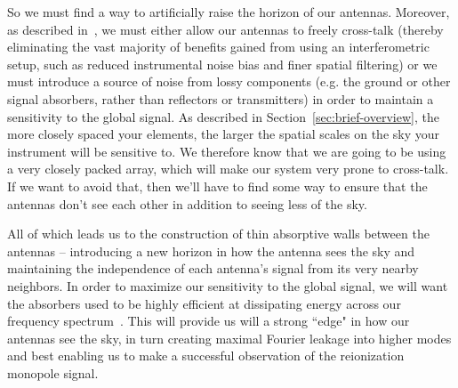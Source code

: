So we must find a way to artificially raise the horizon of our antennas.  
Moreover, as described in~\citet{venumadhav2016}, we must either allow our 
antennas to freely cross-talk (thereby eliminating the vast majority of 
benefits gained from using an interferometric setup, such as reduced 
instrumental noise bias and finer spatial filtering) or we must introduce a 
source of noise from lossy components (e.g.  the ground or other signal 
absorbers, rather than reflectors or transmitters) in order to maintain a 
sensitivity to the global signal. As described in 
Section~\ref{sec:brief-overview}, the more closely spaced your elements, the 
larger the spatial scales on the sky your instrument will be sensitive to. We 
therefore know that we are going to be using a very closely packed array, which 
will make our system very prone to cross-talk. If we want to avoid that, then 
we'll have to find some way to ensure that the antennas don't see each other in 
addition to seeing less of the sky.

All of which leads us to the construction of thin absorptive walls between the 
antennas -- introducing a new horizon in how the antenna sees the sky and 
maintaining the independence of each antenna's signal from its very nearby 
neighbors. In order to maximize our sensitivity to the global signal, we will 
want the absorbers used to be highly efficient at dissipating energy across our 
frequency spectrum~\citep{venumadhav2016}. This will provide us will a strong 
``edge" in how our antennas see the sky, in turn creating maximal Fourier 
leakage into higher modes and best enabling us to make a successful observation 
of the reionization monopole signal.
